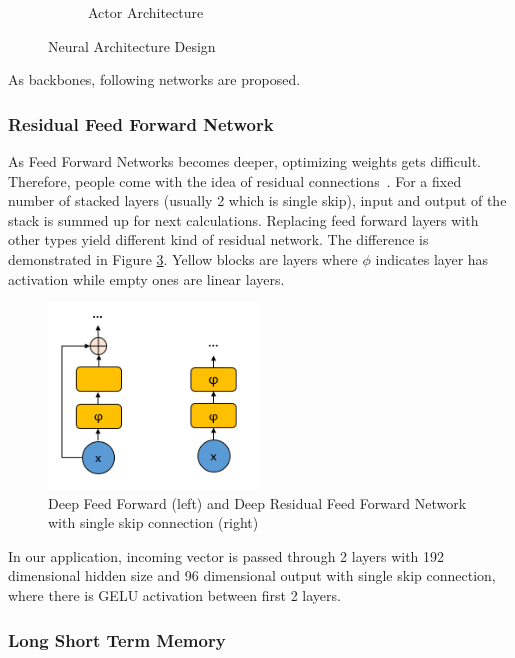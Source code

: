\documentclass[a4paper, 12pt]{article} %
\begin{document}
\begin{figure}
\begin{subfigure}{.35\textwidth}
		\caption{Actor Architecture}
		\label{fig:actor_net}
	\end{subfigure}
	\caption{Neural Architecture Design}
	\label{fig:nets}
\end{figure}

As backbones, following networks are proposed. 

\subsubsection{Residual Feed Forward Network}

As Feed Forward Networks becomes deeper, optimizing weights gets difficult. 
Therefore, people come with the idea of residual connections~\cite{he_deep_2015}. 
For a fixed number of stacked layers (usually 2 which is single skip), input and output of the stack is summed up for next calculations. 
Replacing feed forward layers with other types yield different kind of residual network. 
The difference is demonstrated in Figure \ref{fig:rffnn_ffnn}.
Yellow blocks are layers where $\phi$ indicates layer has activation while empty ones are linear layers.

\begin{figure}
	\centering
	\includegraphics[width=0.5\textwidth]{figures/ml_theory/rffnn_vs_ffnn.png}
	\caption{Deep Feed Forward (left) and Deep Residual Feed Forward Network with single skip connection (right)}
	\label{fig:rffnn_ffnn}
\end{figure}

In our application, incoming vector is passed through 2 layers with 192 dimensional hidden size and 96 dimensional output with single skip connection, where there is GELU activation between first 2 layers. 
 
\subsubsection{Long Short Term Memory}
\end{document}
